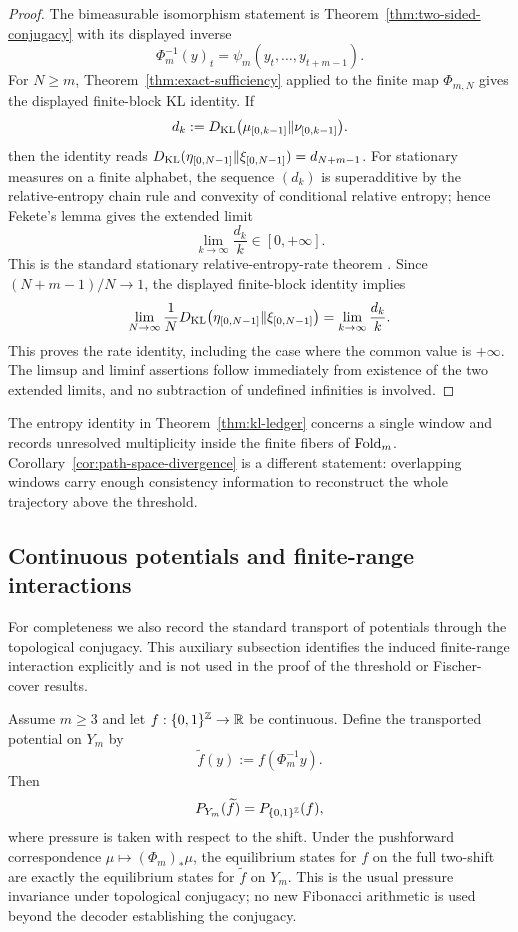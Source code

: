 \begin{proof}
The bimeasurable isomorphism statement is Theorem~\ref{thm:two-sided-conjugacy}
with its displayed inverse
\[
\Phi_m^{-1}(y)_t=\psi_m(y_t,\ldots,y_{t+m-1}).
\]
For $N\ge m$, Theorem~\ref{thm:exact-sufficiency} applied to the finite map
$\Phi_{m,N}$ gives the displayed finite-block KL identity. If
\[
d_k:=D_{\mathrm{KL}}\bigl(\mu_{[0,k-1]}\|\nu_{[0,k-1]}\bigr).
\]
then the identity reads
$D_{\mathrm{KL}}(\eta_{[0,N-1]}\|\xi_{[0,N-1]})=d_{N+m-1}$. For stationary measures on
a finite alphabet, the sequence $(d_k)$ is superadditive by the
relative-entropy chain rule and convexity of conditional relative entropy;
hence Fekete's lemma gives the extended limit
\[
\lim_{k\to\infty}\frac{d_k}{k}\in[0,+\infty].
\]
This is the standard stationary relative-entropy-rate theorem
\cite[Chapter~4]{CoverThomas2006}. Since $(N+m-1)/N\to1$, the displayed
finite-block identity implies
\[
\lim_{N\to\infty}\frac1N
D_{\mathrm{KL}}\bigl(\eta_{[0,N-1]}\|\xi_{[0,N-1]}\bigr)
=
\lim_{k\to\infty}\frac{d_k}{k}.
\]
This proves the rate identity, including the case where the common value is
$+\infty$. The limsup and liminf assertions follow immediately from existence
of the two extended limits, and no subtraction of undefined infinities is
involved.
\end{proof}

\begin{remark}
The entropy identity in Theorem~\ref{thm:kl-ledger} concerns a single
window and records unresolved multiplicity inside the finite fibers of
$\mathrm{Fold}_m$. Corollary~\ref{cor:path-space-divergence} is a different statement:
overlapping windows carry enough consistency information to reconstruct the
whole trajectory above the threshold.
\end{remark}

\subsection{Continuous potentials and finite-range interactions}\label{sec:measurement:renorm}

For completeness we also record the standard transport of potentials through
the topological conjugacy. This auxiliary subsection identifies the induced
finite-range interaction explicitly and is not used in the proof of the
threshold or Fischer-cover results.

\begin{theorem}\label{thm:continuous-potentials}
Assume $m\ge3$ and let $f:\{0,1\}^{\mathbb{Z}}\to\mathbb{R}$ be continuous.  Define the
transported potential on $Y_m$ by
\[
\widetilde f(y):=f(\Phi_m^{-1}y).
\]
Then
\[
P_{Y_m}(\widetilde f)=P_{\{0,1\}^{\mathbb{Z}}}(f),
\]
where pressure is taken with respect to the shift.  Under the pushforward
correspondence $\mu\mapsto(\Phi_m)_*\mu$, the equilibrium states for $f$ on
the full two-shift are exactly the equilibrium states for $\widetilde f$ on
$Y_m$.
This is the usual pressure invariance under topological conjugacy; no new
Fibonacci arithmetic is used beyond the decoder establishing the conjugacy.
\end{theorem}

